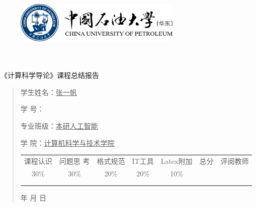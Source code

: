 \documentclass{article}
\renewcommand{\today}{\number\year 年 \number\month 月 \number\day 日}
\begin{document}
\begin{figure}
    \centering
    \includegraphics[width=8cm]{upc.png}

    \label{figupc}
\end{figure}

	\begin{center}
		\quad \\
		\quad \\
		\heiti \fontsize{45}{17} \quad \quad \quad 
		\vskip 1.5cm
		\heiti {} 《计算科学导论》课程总结报告
	\end{center}
	\vskip 2.0cm
		
	\begin{quotation}
		\doublespacing
		
        \par\setlength\parindent{7em}
		\quad 

		学生姓名：\underline{\qquad  张一帆 \qquad \qquad}

		学\hspace{0.61cm} 号：\underline{\qquad}
		
		专业班级：\underline{\qquad 本研人工智能 \qquad  }
		
        学\hspace{0.61cm} 院：\underline{计算机科学与技术学院}
		\vskip 2cm
		\centering
		\begin{table}[h]
            \centering 
            \begin{tabular}{|c|c|c|c|c|c|c|}
                \hline
                课程认识 & 问题思 考 & 格式规范  & IT工具  & Latex附加  & 总分 & 评阅教师 \\
                30\% & 30\% & 20\% & 20\% & 10\% &  &  \\
                \hline
                 & & & & & &\\
                & & & & & &\\
                \hline
            \end{tabular}
        \end{table}
		\vskip 2cm
		\today
	\end{quotation}
\end{document}
